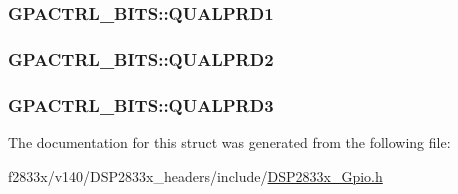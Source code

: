 \subsubsection[{Q\+U\+A\+L\+P\+R\+D1}]{ G\+P\+A\+C\+T\+R\+L\+\_\+\+B\+I\+T\+S\+::\+Q\+U\+A\+L\+P\+R\+D1}\label{struct_g_p_a_c_t_r_l___b_i_t_s_afbe6985bf678ffcf846614bb7f1f0507}
\hypertarget{struct_g_p_a_c_t_r_l___b_i_t_s_a1bb5e7173a98248f70106c6048d4a5a4}{}
\subsubsection[{Q\+U\+A\+L\+P\+R\+D2}]{ G\+P\+A\+C\+T\+R\+L\+\_\+\+B\+I\+T\+S\+::\+Q\+U\+A\+L\+P\+R\+D2}\label{struct_g_p_a_c_t_r_l___b_i_t_s_a1bb5e7173a98248f70106c6048d4a5a4}
\hypertarget{struct_g_p_a_c_t_r_l___b_i_t_s_aeb7639e10787b43b4bdbe6a9e362bb53}{}
\subsubsection[{Q\+U\+A\+L\+P\+R\+D3}]{ G\+P\+A\+C\+T\+R\+L\+\_\+\+B\+I\+T\+S\+::\+Q\+U\+A\+L\+P\+R\+D3}\label{struct_g_p_a_c_t_r_l___b_i_t_s_aeb7639e10787b43b4bdbe6a9e362bb53}


The documentation for this struct was generated from the following file\+:\begin{DoxyCompactItemize}
\item 
f2833x/v140/\+D\+S\+P2833x\+\_\+headers/include/\hyperlink{_d_s_p2833x___gpio_8h}{D\+S\+P2833x\+\_\+\+Gpio.\+h}\end{DoxyCompactItemize}
